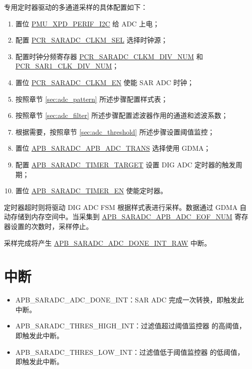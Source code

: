 \documentclass[main\_\_CN.tex]{subfiles}
\begin{document}
专用定时器驱动的多通道采样的具体配置如下：
\begin{enumerate}
    \item 置位 \hyperref[fielddesc:PMUXPDPERIFI2C]{PMU\_XPD\_PERIF\_I2C} 给 ADC 上电；
    \item 配置 \hyperref[fielddesc:PCRSARADCCLKMSEL]{PCR\_SARADC\_CLKM\_SEL} 选择时钟源；
    \item 配置时钟分频寄存器 \hyperref[fielddesc:PCRSARADCCLKMDIVNUM]{PCR\_SARADC\_CLKM\_DIV\_NUM} 和 \hyperref[fielddesc:PCRSAR1CLKDIVNUM]{PCR\_SAR1\_CLK\_DIV\_NUM}；
    \item 置位 \hyperref[fielddesc:PCRSARADCCLKMEN]{PCR\_SARADC\_CLKM\_EN} 使能 SAR ADC 时钟；    
    \item 按照章节 \ref{sec:adc_pattern} \textit{} 所述步骤配置样式表；
    \item 按照章节 \ref{sec:adc_filter} \textit{} 所述步骤配置滤波器作用的通道和滤波系数；
    \item 根据需要，按照章节 \ref{sec:adc_threshold} \textit{} 所述步骤设置阈值监控；
    \item 置位 \hyperref[fielddesc:APBSARADCAPBADCTRANS]{APB\_SARADC\_APB\_ADC\_TRANS} 选择使用 GDMA；
    \item 配置 \hyperref[fielddesc:APBSARADCTIMERTARGET]{APB\_SARADC\_TIMER\_TARGET} 设置 DIG ADC 定时器的触发周期；
    \item 置位 \hyperref[fielddesc:APBSARADCTIMEREN]{APB\_SARADC\_TIMER\_EN} 使能定时器。    
\end{enumerate}

定时器超时则将驱动 DIG ADC FSM 根据样式表进行采样。数据通过 GDMA 自动存储到内存空间中。当采集到 \hyperref[fielddesc:APBSARADCAPBADCEOFNUM]{APB\_SARADC\_APB\_ADC\_EOF\_NUM} 寄存器设置的次数时，采样停止。


采样完成将产生 \hyperref[fielddesc:APBSARADCDONEINTRAW]{APB\_SARADC\_ADC\_DONE\_INT\_RAW} 中断。

\section{中断}

\begin{itemize}
    \item \label{int:SARADCDONEINT1} APB\_SARADC\_ADC\_DONE\_INT：SAR ADC 完成一次转换，即触发此中断。
    \item \label{int:APBSARADCTHRESxHIGHINT} APB\_SARADC\_THRES\_HIGH\_INT：过滤值超过阈值监控器  的高阈值，即触发此中断。
    \item \label{int:APBSARADCTHRESxLOWINT} APB\_SARADC\_THRES\_LOW\_INT：过滤值低于阈值监控器  的低阈值，即触发此中断。
\end{itemize}   
\end{document}
